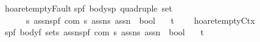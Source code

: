 \begin{isabellebody}
\isanewline
{\isachardoublequoteopen}{\isacharunderscore}hoaret{\isacharunderscore}emptyFault{\isachardoublequoteclose}{\isacharcolon}{\isacharcolon}\isanewline
{\isachardoublequoteopen}{\isacharbrackleft}{\isacharparenleft}{\isacharprime}s{\isacharcomma}{\isacharprime}p{\isacharcomma}{\isacharprime}f{\isacharparenright}\ body{\isacharcomma}{\isacharparenleft}{\isacharprime}s{\isacharcomma}{\isacharprime}p{\isacharparenright}\ quadruple\ set{\isacharcomma}\isanewline
\ \ \ \ \ {\isacharprime}s\ assn{\isacharcomma}{\isacharparenleft}{\isacharprime}s{\isacharcomma}{\isacharprime}p{\isacharcomma}{\isacharprime}f{\isacharparenright}\ com{\isacharcomma}\ {\isacharprime}s\ assn{\isacharcomma}{\isacharprime}s\ assn{\isacharbrackright}\ {\isacharequal}{\isachargreater}\ bool{\isachardoublequoteclose}\isanewline
\ \ \ {\isacharparenleft}{\isachardoublequoteopen}{\isacharparenleft}{}{\isacharunderscore}{\isacharcomma}{\isacharunderscore}{\isacharslash}{\isacharbar}{\isacharminus}t\ {\isacharparenleft}{\isacharunderscore}{\isacharslash}\ {\isacharparenleft}{\isacharunderscore}{\isacharparenright}{\isacharslash}\ {\isacharunderscore}{\isacharcomma}{\isacharslash}{\isacharunderscore}{\isacharparenright}{\isacharparenright}{\isachardoublequoteclose}\ {\isacharbrackleft}{}{}{\isacharcomma}{}{}{\isacharcomma}{}{}{}{}{\isacharcomma}{}{}{\isacharcomma}{}{}{}{}{\isacharcomma}{}{}{}{}{\isacharbrackright}{}{}{\isacharparenright}\isanewline
\isanewline
{\isachardoublequoteopen}{\isacharunderscore}hoaret{\isacharunderscore}emptyCtx{\isachardoublequoteclose}{\isacharcolon}{\isacharcolon}\isanewline
{\isachardoublequoteopen}{\isacharbrackleft}{\isacharparenleft}{\isacharprime}s{\isacharcomma}{\isacharprime}p{\isacharcomma}{\isacharprime}f{\isacharparenright}\ body{\isacharcomma}{\isacharprime}f\ set{\isacharcomma}{\isacharprime}s\ assn{\isacharcomma}{\isacharparenleft}{\isacharprime}s{\isacharcomma}{\isacharprime}p{\isacharcomma}{\isacharprime}f{\isacharparenright}\ com{\isacharcomma}\ {\isacharprime}s\ assn{\isacharcomma}{\isacharprime}s\ assn{\isacharbrackright}\ {\isacharequal}{\isachargreater}\ bool{\isachardoublequoteclose}\isanewline
\ \ \ {\isacharparenleft}{\isachardoublequoteopen}{\isacharparenleft}{}{\isacharunderscore}{\isacharslash}{\isacharbar}{\isacharminus}t{\isacharprime}{\isacharslash}{\isacharunderscore}\ {\isacharparenleft}{\isacharunderscore}{\isacharslash}\ {\isacharparenleft}{\isacharunderscore}{\isacharparenright}{\isacharslash}\ {\isacharunderscore}{\isacharcomma}{\isacharslash}{\isacharunderscore}{\isacharparenright}{\isacharparenright}{\isachardoublequoteclose}\ {\isacharbrackleft}{}{}{\isacharcomma}{}{}{\isacharcomma}{}{}{}{}{\isacharcomma}{}{}{\isacharcomma}{}{}{}{}{\isacharcomma}{}{}{}{}{\isacharbrackright}{}{}{\isacharparenright}\isanewline

\end{isabellebody}
